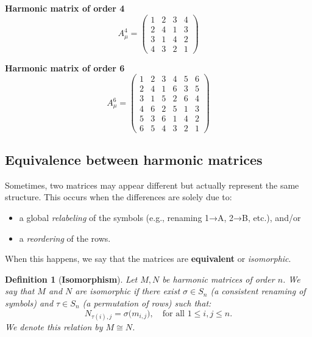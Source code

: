 \documentclass{article}
\newtheorem{definition}[theorem]{Definition}
\begin{document}
\begin{center}
\begin{minipage}{0.45\textwidth}
\centering
\textbf{Harmonic matrix of order 4}
\[
A_\mu^4 =
\begin{pmatrix}
1 & 2 & 3 & 4\\
2 & 4 & 1 & 3\\
3 & 1 & 4 & 2\\
4 & 3 & 2 & 1
\end{pmatrix}
\]
\end{minipage}
\hfill
\begin{minipage}{0.45\textwidth}
\centering
\textbf{Harmonic matrix of order 6}
\[
A_\mu^6 =
\begin{pmatrix}
1 & 2 & 3 & 4 & 5 & 6 \\
2 & 4 & 1 & 6 & 3 & 5 \\
3 & 1 & 5 & 2 & 6 & 4 \\
4 & 6 & 2 & 5 & 1 & 3 \\
5 & 3 & 6 & 1 & 4 & 2 \\
6 & 5 & 4 & 3 & 2 & 1
\end{pmatrix}
\]
\end{minipage}
\end{center}

\subsection{Equivalence between harmonic matrices}

Sometimes, two matrices may appear different but actually represent the same structure. This occurs when the differences are solely due to:

\begin{itemize}
    \item a global \emph{relabeling} of the symbols (e.g., renaming 1→A, 2→B, etc.), and/or
    \item a \emph{reordering} of the rows.
\end{itemize}

When this happens, we say that the matrices are \textbf{equivalent} or \emph{isomorphic}.

\begin{definition}[\textbf{Isomorphism}]
Let \(M, N\) be harmonic matrices of order \(n\).  
We say that \(M\) and \(N\) are \emph{isomorphic} if there exist \(\sigma \in S_n\) (a consistent renaming of symbols) and \(\tau \in S_n\) (a permutation of rows) such that:
\[
  N_{\tau(i), j} = \sigma\bigl(m_{i, j}\bigr),
  \quad \text{for all } 1 \le i, j \le n.
\]
We denote this relation by \(M \cong N\).
\end{definition}
\end{document}
